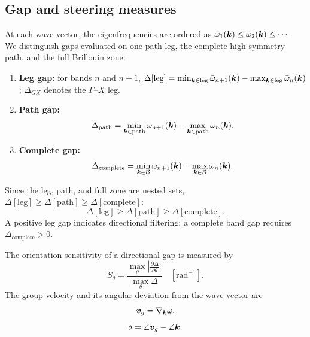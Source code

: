 \subsection{Gap and steering measures}
At each wave vector, the eigenfrequencies are ordered as $\bar{\omega}_1(\bm{k})\le\bar{\omega}_2(\bm{k})\le\cdots$. We distinguish gaps evaluated on one path leg, the complete high-symmetry path, and the full Brillouin zone:
\begin{enumerate}[label=(\alph*)]
  \item \textbf{Leg gap:} for bands $n$ and $n+1$, $\Delta[\mathrm{leg}]=\min_{\bm{k}\in\mathrm{leg}}\bar{\omega}_{n+1}(\bm{k})-\max_{\bm{k}\in\mathrm{leg}}\bar{\omega}_n(\bm{k})$; $\Delta_{GX}$ denotes the $\Gamma$--$X$ leg.
  \item \textbf{Path gap:}
  \begin{equation}
  \Delta_{\mathrm{path}}=\min_{\bm{k}\in\mathrm{path}}\bar{\omega}_{n+1}(\bm{k})-\max_{\bm{k}\in\mathrm{path}}\bar{\omega}_n(\bm{k}).
  \label{eq:delta_path}
  \end{equation}
  \item \textbf{Complete gap:}
  \begin{equation}
  \Delta_{\mathrm{complete}}=\min_{\bm{k}\in\mathcal{B}}\bar{\omega}_{n+1}(\bm{k})-\max_{\bm{k}\in\mathcal{B}}\bar{\omega}_n(\bm{k}).
  \label{eq:delta_complete}
  \end{equation}
\end{enumerate}
Since the leg, path, and full zone are nested sets, $\Delta[\mathrm{leg}]\ge\Delta[\mathrm{path}]\ge\Delta[\mathrm{complete}]$:
\begin{equation}
\Delta[\mathrm{leg}]\ge\Delta[\mathrm{path}]\ge\Delta[\mathrm{complete}].
\label{eq:gap_hierarchy}
\end{equation}
A positive leg gap indicates directional filtering; a complete band gap requires $\Delta_{\mathrm{complete}}>0$.

The orientation sensitivity of a directional gap is measured by
\begin{equation}
S_\theta=\frac{\max_\theta\left|\frac{\partial\Delta}{\partial\theta}\right|}{\max_\theta\Delta}\quad[\mathrm{rad}^{-1}].
\label{eq:S_theta_def}
\end{equation}
The group velocity and its angular deviation from the wave vector are
\begin{equation}
\bm{v}_g=\nabla_{\bm{k}}\omega.
\label{eq:group_velocity}
\end{equation}
\begin{equation}
\delta=\angle\bm{v}_g-\angle\bm{k}.
\label{eq:steering_angle}
\end{equation}
